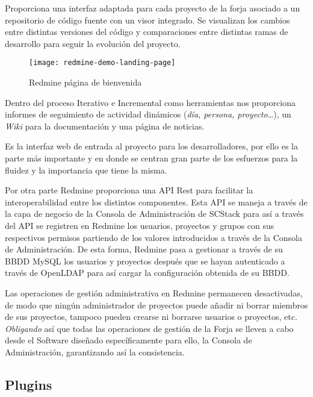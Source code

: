 \par Proporciona una interfaz adaptada para cada proyecto de la forja asociado a un repositorio de código fuente con un visor integrado. Se visualizan los cambios entre distintas versiones del código y comparaciones entre distintas ramas de desarrollo para seguir la evolución del proyecto.

\begin{figure}[H]
    \centering
    \texttt{[image: redmine-demo-landing-page]}
    \caption{Redmine página de bienvenida}
    \label{fig:redmine-demo-landing-page}
\end{figure}

\par Dentro del proceso Iterativo e Incremental como herramientas nos proporciona informes de seguimiento de actividad dinámicos (\emph{día, persona, proyecto\ldots}), un \emph{Wiki} para la documentación y una página de noticias.

\par Es la interfaz web de entrada al proyecto para los desarrolladores, por ello es la parte más importante y en donde se centran gran parte de los esfuerzos para la fluidez y la importancia que tiene la misma.

\par Por otra parte Redmine proporciona una API Rest para facilitar la interoperabilidad entre los distintos componentes. Esta API se maneja a través de la capa de negocio de la Consola de Administración de SCStack para así a través del API se registren en Redmine los usuarios, proyectos y grupos con sus respectivos permisos partiendo de los valores introducidos a través de la Consola de Administración. De esta forma, Redmine pasa a gestionar a través de su BBDD MySQL los usuarios y proyectos después que se hayan autenticado a través de OpenLDAP para así cargar la configuración obtenida de su BBDD.

\par Las operaciones de gestión administrativa en Redmine permanecen desactivadas, de modo que ningún administrador de proyectos puede añadir ni borrar miembros de sus proyectos, tampoco pueden crearse ni borrarse usuarios o proyectos, etc. \emph{Obligando} así que todas las operaciones de gestión de la Forja se lleven a cabo desde el Software diseñado específicamente para ello, la Consola de Administración, garantizando así la consistencia.

\subsection{Plugins}
\label{sub:redmine-plugins}

